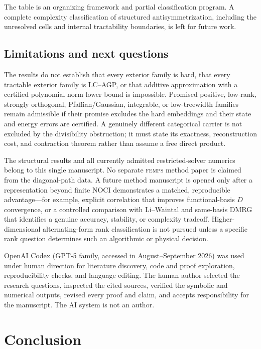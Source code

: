 \documentclass[11pt]{article}
\theoremstyle{definition}
\newcommand{\FEMPS}{\textnormal{\textsc{femps}}}
\begin{document}
The table is an organizing framework and partial classification program.  A
complete complexity classification of structured antisymmetrization,
including the unresolved cells and internal tractability boundaries, is left
for future work.

\subsection{Limitations and next questions}

The results do not establish that every exterior family is hard, that every
tractable exterior family is LC--AGP, or that additive approximation with a
certified polynomial norm lower bound is impossible.  Promised positive,
low-rank, strongly orthogonal, Pfaffian/Gaussian, integrable, or low-treewidth
families remain admissible if their promise excludes the hard embeddings and
their state and energy errors are certified.  A genuinely different
categorical carrier is not excluded by the divisibility obstruction; it must
state its exactness,
reconstruction cost, and contraction theorem rather than assume a free direct
product.

The structural results and all currently admitted restricted-solver numerics
belong to this single manuscript.  No separate \FEMPS{} method paper is claimed
from the diagonal-path data.  A future method manuscript is opened only after
a representation beyond finite NOCI demonstrates a matched, reproducible
advantage---for example, explicit correlation that improves functional-basis
$D$ convergence, or a controlled comparison with Li--Waintal and same-basis
DMRG that identifies a genuine accuracy, stability, or complexity tradeoff.
Higher-dimensional alternating-form rank classification is not pursued unless
a specific rank question determines such an algorithmic or physical decision.

OpenAI Codex (GPT-5 family, accessed in August--September 2026) was used under
human direction for literature discovery, code and proof exploration,
reproducibility checks, and language editing.  The human author selected the
research questions, inspected the cited sources, verified the symbolic and
numerical outputs, revised every proof and claim, and accepts responsibility
for the manuscript.  The AI system is not an author.

\section{Conclusion}
\end{document}
